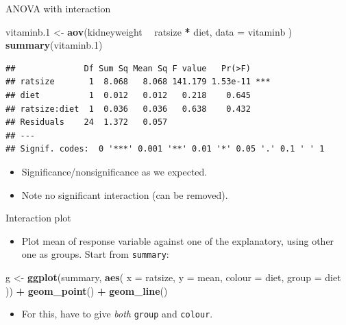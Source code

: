 \documentclass[
  ignorenonframetext,
]{beamer}
\newenvironment{Shaded}{\begin{snugshade}}{\end{snugshade}}
\newcommand{\DataTypeTok}[1]{\textcolor[rgb]{0.13,0.29,0.53}{#1}}
\newcommand{\FloatTok}[1]{\textcolor[rgb]{0.00,0.00,0.81}{#1}}
\newcommand{\KeywordTok}[1]{\textcolor[rgb]{0.13,0.29,0.53}{\textbf{#1}}}
\newcommand{\NormalTok}[1]{#1}
\newcommand{\OperatorTok}[1]{\textcolor[rgb]{0.81,0.36,0.00}{\textbf{#1}}}
\newcommand{\StringTok}[1]{\textcolor[rgb]{0.31,0.60,0.02}{#1}}
\providecommand{\tightlist}{%
  \setlength{\itemsep}{0pt}\setlength{\parskip}{0pt}}
\begin{document}
\begin{frame}[fragile]{ANOVA with interaction}
\protect\hypertarget{anova-with-interaction}{}

\begin{Shaded}
\begin{Highlighting}[]
\NormalTok{vitaminb}\FloatTok{.1}\NormalTok{ <-}\StringTok{ }\KeywordTok{aov}\NormalTok{(kidneyweight }\OperatorTok{~}\StringTok{ }\NormalTok{ratsize }\OperatorTok{*}\StringTok{ }\NormalTok{diet,}
  \DataTypeTok{data =}\NormalTok{ vitaminb}
\NormalTok{)}
\KeywordTok{summary}\NormalTok{(vitaminb}\FloatTok{.1}\NormalTok{)}
\end{Highlighting}
\end{Shaded}

\begin{verbatim}
##              Df Sum Sq Mean Sq F value   Pr(>F)    
## ratsize       1  8.068   8.068 141.179 1.53e-11 ***
## diet          1  0.012   0.012   0.218    0.645    
## ratsize:diet  1  0.036   0.036   0.638    0.432    
## Residuals    24  1.372   0.057                     
## ---
## Signif. codes:  0 '***' 0.001 '**' 0.01 '*' 0.05 '.' 0.1 ' ' 1
\end{verbatim}

\begin{itemize}
\tightlist
\item
  Significance/nonsignificance as we expected.
\item
  Note no significant interaction (can be removed).
\end{itemize}

\end{frame}

\begin{frame}[fragile]{Interaction plot}
\protect\hypertarget{interaction-plot}{}

\begin{itemize}
\tightlist
\item
  Plot mean of response variable against one of the explanatory, using
  other one as groups. Start from \texttt{summary}:
\end{itemize}

\begin{Shaded}
\begin{Highlighting}[]
\NormalTok{g <-}\StringTok{ }\KeywordTok{ggplot}\NormalTok{(summary, }\KeywordTok{aes}\NormalTok{(}
  \DataTypeTok{x =}\NormalTok{ ratsize, }\DataTypeTok{y =}\NormalTok{ mean,}
  \DataTypeTok{colour =}\NormalTok{ diet, }\DataTypeTok{group =}\NormalTok{ diet}
\NormalTok{)) }\OperatorTok{+}
\StringTok{  }\KeywordTok{geom_point}\NormalTok{() }\OperatorTok{+}\StringTok{ }\KeywordTok{geom_line}\NormalTok{()}
\end{Highlighting}
\end{Shaded}

\begin{itemize}
\tightlist
\item
  For this, have to give \emph{both} \texttt{group} and \texttt{colour}.
\end{itemize}

\end{frame}
\end{document}

